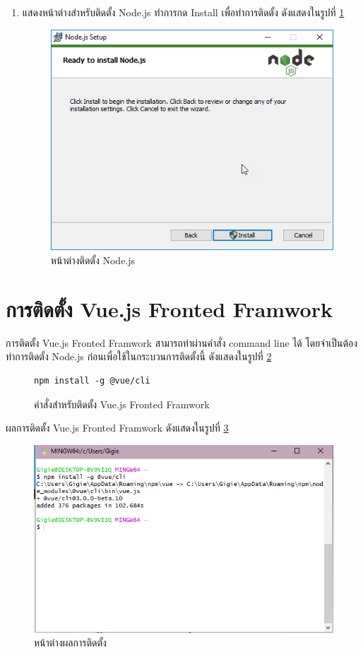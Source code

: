 \begin{enumerate}
	\item แสดงหน้าต่างสำหรับติดตั้ง Node.js ทำการกด Install เพื่อทำการติดตั้ง ดังแสดงในรูปที่ \ref{Fig:nodeInstall6}
	\begin{figure}[H]
		\centering
		\includegraphics[width=0.7\columnwidth]{Figures/7/6}
		\caption{หน้าต่างติดตั้ง Node.js}
		\label{Fig:nodeInstall6}
	\end{figure}
\end{enumerate}

\section{การติดตั้ง Vue.js Fronted Framwork}
การติดตั้ง Vue.js Fronted Framwork สามารถทำผ่านคำสั่ง command line ได้ โดยจำเป็นต้องทำการติดตั้ง Node.js ก่อนเพื่อใช้ในกระบวนการติดตั้งนี้ ดังแสดงในรูปที่ \ref{Fig:Vue}
\begin{figure}[H]
	{\begin{lstlisting}[numbers=none]
		npm install -g @vue/cli            
		\end{lstlisting}}
	\caption{คำสั่งสำหรับติดตั้ง Vue.js Fronted Framwork}
	\label{Fig:Vue}
\end{figure}
\newpage
ผลการติดตั้ง Vue.js Fronted Framwork ดังแสดงในรูปที่ \ref{Fig:หน้าต่างผลการติดตั้ง}
\begin{figure}[H]
	\centering
	\includegraphics[width=\columnwidth]{Figures/prepareation/vue}
	\caption{หน้าต่างผลการติดตั้ง}
	\label{Fig:หน้าต่างผลการติดตั้ง}
\end{figure}